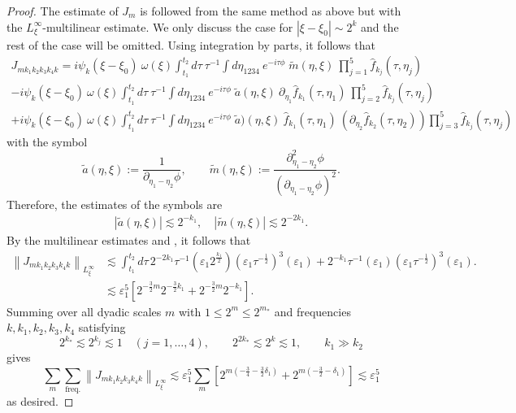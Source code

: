\documentclass[reqno,english,11pt]{amsart}
\newcommand{\eps}{\varepsilon}
\newcommand{\snorm}[1]{\left\|#1\right\|}
\theoremstyle{definition}
\numberwithin{equation}{section}
\begin{document}
\begin{proof}
The estimate of $J_m$ is followed from the same method as above but with the  $L^\infty_\xi$-multilinear estimate. We only discuss the case for $|\xi-\xi_0|\sim 2^k$ and the rest of the case will be omitted.  Using integration by parts, it follows that
\begin{multline*}
    J_{mk_1k_2k_3k_4k}= i \psi_{k}(\xi-\xi_0) \ \omega(\xi) \int_{t_1}^{t_2}  d \tau \ \tau^{-1} \int d\eta_{1234}\ e^{-i\tau\phi}\;\tilde{m}(\eta,\xi) \ \prod^5_{j=1}\widehat{f}_{k_{j}}(\tau,\eta_j)
\\
    -i \psi_{k}(\xi-\xi_0) \ \omega(\xi) \int_{t_1}^{t_2}  d \tau \ \tau^{-1}\int d\eta_{1234}\ e^{-i\tau\phi}\; \tilde{a}(\eta,\xi) \ \partial_{\eta_1}\widehat{f}_{k_{1}}(\tau,\eta_{1})\ \prod^5_{j=2}\widehat{f}_{k_{j}}(\tau,\eta_j)
\\
    +i \psi_{k}(\xi-\xi_0) \ \omega(\xi) \int_ {t_1}^{t_2}  d \tau  \ \tau^{-1}\int d\eta_{1234} \ e^{-i\tau\phi}\; \tilde{a})(\eta,\xi) \ \hat{f}_{k_{1}}(\tau,\eta_{1})\ \left(\partial_{\eta_{2}}\hat{f}_{k_2}(\tau,\eta_{2})\right)\prod^5_{j=3}\widehat{f}_{k_{j}}(\tau,\eta_j)
\end{multline*}
with the symbol
\begin{equation}\label{eq:def_a_tilde_symbol}
\tilde{a}(\eta,\xi):=\frac{1}{ \partial_{\eta_1-\eta_2}\phi},\qquad
\tilde{m}(\eta,\xi):=\frac{\partial^2_{\eta_1-\eta_2}\phi}{ (\partial_{\eta_1-\eta_2}\phi)^2} .
\end{equation}
Therefore, the estimates of the symbols are
\begin{align}
     \left|\tilde{a}(\eta,\xi) \right| \lesssim 2^{-k_{1}}, \quad \left|\tilde{m}(\eta,\xi)\right| \lesssim 2^{-2k_{1}}. 
    \end{align}
By the multilinear estimates and \cite[Proposition B.6]{Morgan}, it follows that
\begin{align*}
    \snorm{J_{mk_1k_2k_3k_4k}}_{L^\infty_\xi}&\lesssim\int_{t_1}^{t_2} d\tau \, 2^{-2k_1} \tau^{-1} 
\left( \eps_1 2^{\frac{k_1}{2}} \right)
\left( \eps_1 \tau^{-\frac{1}{2}} \right)^3 (\eps_1)
+ 2^{-k_1} \tau^{-1} 
\left( \eps_1 \right)
\left( \eps_1 \tau^{-\frac{1}{2}} \right)^3 (\eps_1). \\
    &\lesssim \eps_1^5\left[2^{-\frac{3}{2}m}2^{-\frac{3}{2}k_1}+2^{-\frac{3}{2}m}2^{-k_1}\right].
\end{align*}
Summing over all dyadic scales $m$ with $1\leq 2^m\leq 2^{m_*}$ and frequencies $k, k_1,k_2,k_3,k_4$ satisfying $$2^{k_*}\lesssim 2^{k_j}\lesssim 1 \quad (j=1,\dots,4), \qquad 2^{2k_*}\lesssim 2^k\lesssim 1, \qquad k_1\gg k_2$$ gives
\begin{equation}
    \sum_m\sum_{\operatorname{freq.}}
        \snorm{J_{m k_1 k_2 k_3 k_4 k} }_{L^\infty_\xi}
        \lesssim \eps_1^5\sum_{m} \left[2^{m(-\frac{3}{4}-\frac{3}{2}\delta_1)}+2^{m(-\frac{3}{2}-\delta_1)}\right]\lesssim \eps_1^5
    \end{equation}
as desired.    
\end{proof}
\end{document}
